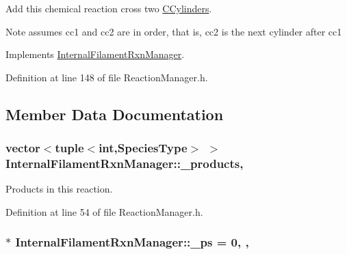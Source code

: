Add this chemical reaction cross two \hyperlink{classCCylinder}{C\+Cylinders}. 

\begin{DoxyNote}{Note}
assumes cc1 and cc2 are in order, that is, cc2 is the next cylinder after cc1 
\end{DoxyNote}


Implements \hyperlink{classInternalFilamentRxnManager_ac8152bcd9f6aa5d69f85a98cff86d2b0}{Internal\+Filament\+Rxn\+Manager}.



Definition at line 148 of file Reaction\+Manager.\+h.



\subsection{Member Data Documentation}
\hypertarget{classInternalFilamentRxnManager_afd213da1a3706e2e88962e5da886a5dc}{
\subsubsection[{\+\_\+products}]{\setlength{\rightskip}{0pt plus 5cm}vector$<$tuple$<$int,{\bf Species\+Type}$>$ $>$ Internal\+Filament\+Rxn\+Manager\+::\+\_\+products\hspace{0.3cm}{\ttfamily [protected]}, {\ttfamily [inherited]}}}\label{classInternalFilamentRxnManager_afd213da1a3706e2e88962e5da886a5dc}


Products in this reaction. 



Definition at line 54 of file Reaction\+Manager.\+h.

\hypertarget{classInternalFilamentRxnManager_a973ce9cc2aae811e6867afa46193c5f2}{
\subsubsection[{\+\_\+ps}]{ $\ast$ Internal\+Filament\+Rxn\+Manager\+::\+\_\+ps = 0\hspace{0.3cm}{\ttfamily [static]}, {\ttfamily [protected]}, {\ttfamily [inherited]}}}\label{classInternalFilamentRxnManager_a973ce9cc2aae811e6867afa46193c5f2}


